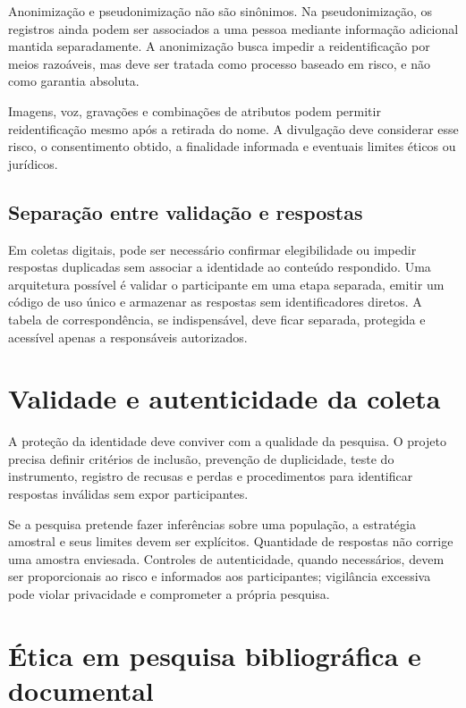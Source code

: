 Anonimização e pseudonimização não são sinônimos. Na pseudonimização, os registros ainda podem ser associados a uma pessoa mediante informação adicional mantida separadamente. A anonimização busca impedir a reidentificação por meios razoáveis, mas deve ser tratada como processo baseado em risco, e não como garantia absoluta.

Imagens, voz, gravações e combinações de atributos podem permitir reidentificação mesmo após a retirada do nome. A divulgação deve considerar esse risco, o consentimento obtido, a finalidade informada e eventuais limites éticos ou jurídicos.

\subsection{Separação entre validação e respostas}

Em coletas digitais, pode ser necessário confirmar elegibilidade ou impedir respostas duplicadas sem associar a identidade ao conteúdo respondido. Uma arquitetura possível é validar o participante em uma etapa separada, emitir um código de uso único e armazenar as respostas sem identificadores diretos. A tabela de correspondência, se indispensável, deve ficar separada, protegida e acessível apenas a responsáveis autorizados.

\section{Validade e autenticidade da coleta}

A proteção da identidade deve conviver com a qualidade da pesquisa. O projeto precisa definir critérios de inclusão, prevenção de duplicidade, teste do instrumento, registro de recusas e perdas e procedimentos para identificar respostas inválidas sem expor participantes.

Se a pesquisa pretende fazer inferências sobre uma população, a estratégia amostral e seus limites devem ser explícitos. Quantidade de respostas não corrige uma amostra enviesada. Controles de autenticidade, quando necessários, devem ser proporcionais ao risco e informados aos participantes; vigilância excessiva pode violar privacidade e comprometer a própria pesquisa.

\section{Ética em pesquisa bibliográfica e documental}

